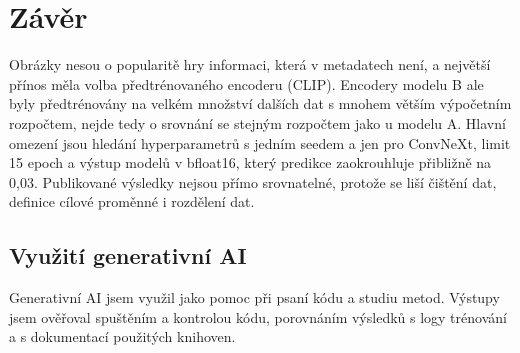 \section{Závěr}

Obrázky nesou o popularitě hry informaci, která v metadatech není, a největší přínos měla volba
předtrénovaného encoderu (CLIP). Encodery modelu B ale byly předtrénovány na velkém množství
dalších dat s mnohem větším výpočetním rozpočtem, nejde tedy o srovnání se stejným rozpočtem
jako u modelu A. Hlavní omezení jsou hledání hyperparametrů s jedním seedem a jen pro
ConvNeXt, limit 15 epoch a výstup modelů v bfloat16, který predikce zaokrouhluje přibližně
na 0,03. Publikované výsledky nejsou přímo srovnatelné, protože se liší čištění dat, definice
cílové proměnné i rozdělení dat.

\subsection*{Využití generativní AI}

Generativní AI jsem využil jako pomoc při psaní kódu a studiu metod. Výstupy jsem ověřoval
spuštěním a kontrolou kódu, porovnáním výsledků s logy trénování a s dokumentací použitých
knihoven.
